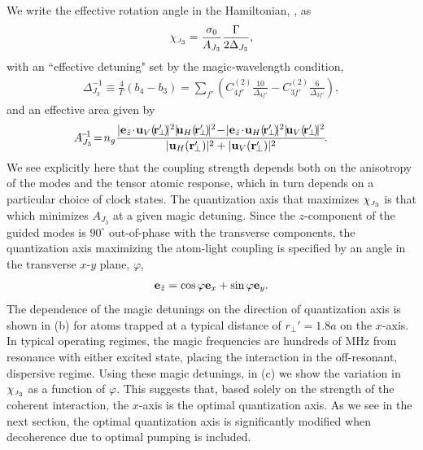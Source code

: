 \documentclass[aps,pra,twocolumn]{revtex4-1} %
\newcommand{\qaxis}{\mathbf{e}_{\tilde{z}}}
\newcommand{\chieff}{\chi_{\raisebox{-.1pt}{\tiny $J_3$}}}
\newcommand{\comment}[1]{{\color{Maroon} #1}}
\begin{document}
We write the effective rotation angle in the Hamiltonian, , as
	\begin{align} \label{Eq::chieff}
		\chieff = \frac{\sigma_0}{A_{J_3}} \frac{\Gamma}{ 2 \Delta_{J_3}},
	\end{align}
with an ``effective detuning" set by the magic-wavelength condition,
	\begin{align} \label{Eq::SqueezingEffectiveDetuning}
		 \Delta_{J_3}^{-1} \equiv \frac{4}{\Gamma} (b_4 \!-\! b_3) =\!   \sum_{f'}\!  \left( C^{(2)}_{4f'}\!\frac{10}{\Delta_{4f'}} \!-\!  C^{(2)}_{3f'}\!\frac{6}{ \Delta_{3f'} } \right),
	\end{align}
and an effective area given by
	\begin{align} \label{Eq::SqueezingModeArea}
		\!\!\!\!\!A_{J_3}^{\!-\!1} & \!=\! n_g \frac{ |\mathbf{e}_{\tilde{z}} \!\cdot\! \mathbf{u}_V(\!\br'\!\!_\perp\!)\!|^2 |\!\mathbf{u}_H(\!\br'\!\!_\perp\!)\!|^2 \!-\! |\mathbf{e}_{\tilde{z}} \!\cdot\! \mathbf{u}_H(\!\br'\!\!_\perp\!) \!|^2 |\!\mathbf{u}_V(\!\br'\!\!_\perp\!)\!|^2 }{ |\mathbf{u}_H(\br'\!\!_\perp)|^2 + |\mathbf{u}_V(\br'\!\!_\perp)|^2 } \!.
	\end{align}	
{\color{blue} We see explicitly here that the coupling strength depends both on the anisotropy of the modes and the tensor atomic response, which in turn depends on a particular choice of clock states.}  The quantization axis that maximizes $\chieff$ is that which minimizes $A_{J_3}$ at a given magic detuning.  
Since the $z$-component of the guided modes is $90^\circ$ out-of-phase with the transverse components, the quantization axis maximizing the atom-light coupling is specified by \comment{an angle in the transverse $x$-$y$ plane, $\varphi$},
	\begin{align} \label{Eq::QuantizationAxis}
		\qaxis = \cos \varphi \mbf{e}_x + \sin \varphi \mbf{e}_y.
	\end{align}
The dependence of the magic detunings on the direction of quantization axis is shown in (b) for atoms trapped at a typical distance of $r_\perp'=1.8a$ on the $x$-axis.   
In typical operating regimes, the magic frequencies are hundreds of MHz from resonance with either excited state, placing the interaction in the off-resonant, dispersive regime.  
Using these magic detunings, in (c) we show the variation in $\chieff$ as a function of $\varphi$.  
This suggests that, based solely on the strength of the coherent interaction, the $x$-axis is the optimal quantization axis. 
As we see in the next section, the optimal quantization axis is significantly modified when decoherence due to optimal pumping is included.
\end{document}
